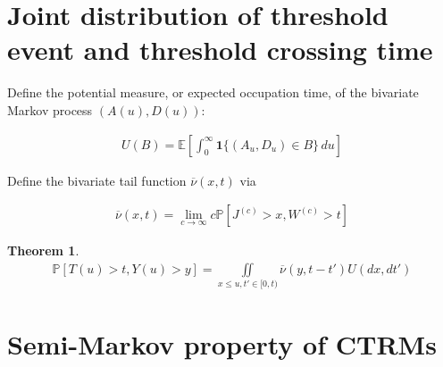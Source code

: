 \documentclass[12pt, a4paper]{article}
\newtheorem{theorem}[equation]{Theorem}
\newcommand{\ex}{\mathbb {E}}
\newcommand{\pr}{\mathbb {P}}
\newcommand{\1}{\mathbf 1}
\begin{document}
\section{Joint distribution of threshold event and threshold crossing time}

Define the potential measure, or expected occupation time, of the bivariate 
Markov process $(A(u),D(u))$:

\begin{align*}
U(B) = \ex \left[ \int_0^\infty \mathbf 1\{ (A_u, D_u) \in B\}\,du \right]
\end{align*}

Define the bivariate tail function $\overline \nu(x,t)$ via 

\begin{align}
\overline \nu(x,t) = \lim_{c \to \infty} c \pr [J^{(c)} > x, W^{(c)} > t]
\end{align}


\begin{theorem}
\begin{align}
\pr [T(u) > t, Y(u) > y]
= \iint\limits_{x \le u, t' \in [0,t)} \overline \nu(y, t - t') U(dx, dt')
\end{align}
\end{theorem}


\section{Semi-Markov property of CTRMs}
\label{sec:records}
\end{document}

